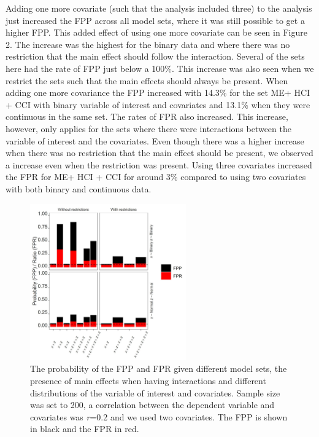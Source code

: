 Adding one more covariate (such that the analysis included three) to the analysis just increased the FPP across all model sets, where it was still possible to get a higher FPP. This added effect of using one more covariate can be seen in Figure 2. The increase was the highest for the binary data and where there was no restriction that the main effect should follow the interaction. Several of the sets here had the rate of FPP just below a 100\%. This increase was also seen when we restrict the sets such that the main effects should always be present. When adding one more covariance the FPP increased with 14.3\% for the set ME+ HCI + CCI with binary variable of interest and covariates and 13.1\% when they were continuous in the same set. The rates of FPR also increased. This increase, however, only applies for the sets where there were interactions between the variable of interest and the covariates. Even though there was a higher increase when there was no restriction that the main effect should be present, we observed a increase even when the restriction was present. Using three covariates increased the FPR for ME+ HCI + CCI for around 3\% compared to using two covariates with both binary and continuous data. 

\begin{figure}[hbt!]
\includegraphics[width=0.6\textwidth]{R/Analysis/Result/Figures/Figure1A.jpeg}
\centering
\caption{The probability of the FPP and FPR given different model sets, the presence of main effects when having interactions and different distributions of the variable of interest and covariates. Sample size was set to 200, a correlation between the dependent variable and covariates was \textit{r}=0.2 and we used two covariates. The FPP is shown in black and the FPR in red.}
\label{fig:mainfigure}
\end{figure}

